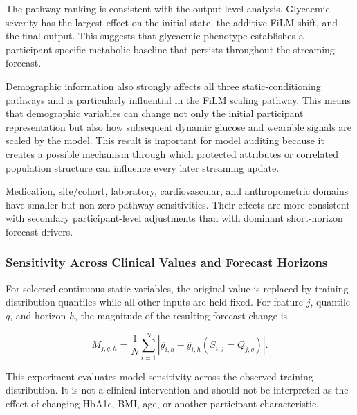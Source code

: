 The pathway ranking is consistent with the output-level analysis. Glycaemic
severity has the largest effect on the initial state, the additive FiLM shift,
and the final output. This suggests that glycaemic phenotype establishes a
participant-specific metabolic baseline that persists throughout the streaming
forecast.

Demographic information also strongly affects all three static-conditioning
pathways and is particularly influential in the FiLM scaling pathway. This
means that demographic variables can change not only the initial participant
representation but also how subsequent dynamic glucose and wearable signals are
scaled by the model. This result is important for model auditing because it
creates a possible mechanism through which protected attributes or correlated
population structure can influence every later streaming update.

Medication, site/cohort, laboratory, cardiovascular, and anthropometric domains
have smaller but non-zero pathway sensitivities. Their effects are more
consistent with secondary participant-level adjustments than with dominant
short-horizon forecast drivers.

\subsubsection{Sensitivity Across Clinical Values and Forecast Horizons}
\label{subsec:interp_static_curves}

For selected continuous static variables, the original value is replaced by
training-distribution quantiles while all other inputs are held fixed. For
feature $j$, quantile $q$, and horizon $h$, the magnitude of the resulting
forecast change is

\begin{equation}
M_{j,q,h}
=
\frac{1}{N}
\sum_{i=1}^{N}
\left|
\widehat{y}_{i,h}
-
\widehat{y}_{i,h}
\left(S_{i,j}=Q_{j,q}\right)
\right|.
\label{eq:static_quantile_sensitivity}
\end{equation}

This experiment evaluates model sensitivity across the observed training
distribution. It is not a clinical intervention and should not be interpreted
as the effect of changing HbA1c, BMI, age, or another participant
characteristic.

